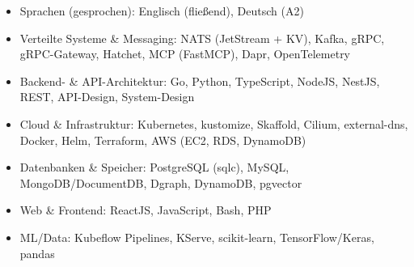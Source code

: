 \documentclass[10pt,a4paper]{resume}
\begin{document}
\begin{itemize}[leftmargin=1.4em,nosep,topsep=2pt]
  \item Sprachen (gesprochen): Englisch (fließend), Deutsch (A2)
  \item Verteilte Systeme \& Messaging: NATS (JetStream + KV), Kafka, gRPC, gRPC-Gateway, Hatchet, MCP (FastMCP), Dapr, OpenTelemetry
  \item Backend- \& API-Architektur: Go, Python, TypeScript, NodeJS, NestJS, REST, API-Design, System-Design
  \item Cloud \& Infrastruktur: Kubernetes, kustomize, Skaffold, Cilium, external-dns, Docker, Helm, Terraform, AWS (EC2, RDS, DynamoDB)
  \item Datenbanken \& Speicher: PostgreSQL (sqlc), MySQL, MongoDB/DocumentDB, Dgraph, DynamoDB, pgvector
  \item Web \& Frontend: ReactJS, JavaScript, Bash, PHP
  \item ML/Data: Kubeflow Pipelines, KServe, scikit-learn, TensorFlow/Keras, pandas
\end{itemize}
\end{document}
